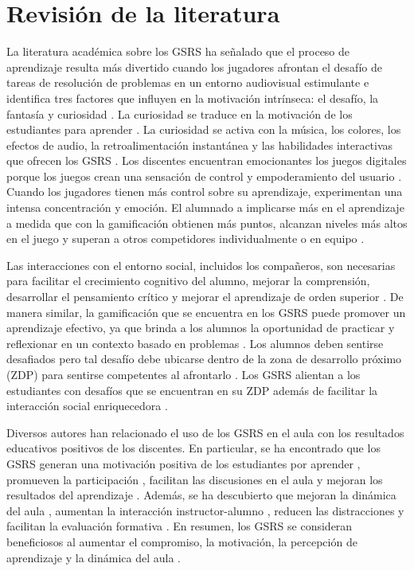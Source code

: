 \documentclass[spanish]{textolivre}
\begin{document}
\section{Revisión de la literatura}\label{sec-2}
La literatura académica sobre los GSRS ha señalado que el proceso de aprendizaje resulta más divertido cuando los jugadores afrontan el desafío de tareas de resolución de problemas en un entorno audiovisual estimulante e identifica tres factores que influyen en la motivación intrínseca: el desafío, la fantasía y curiosidad \cite{licorish2018, malone1981, wang2015}. La curiosidad se traduce en la motivación de los estudiantes para aprender \cite{ryan2000}. La curiosidad se activa con la música, los colores, los efectos de audio, la retroalimentación instantánea y las habilidades interactivas que ofrecen los GSRS \cite{malone1981}. Los discentes encuentran emocionantes los juegos digitales porque los juegos crean una sensación de control y empoderamiento del usuario \cite{malone1981}. Cuando los jugadores tienen más control sobre su aprendizaje, experimentan una intensa concentración y emoción. El alumnado a implicarse más en el aprendizaje a medida que con la gamificación obtienen más puntos, alcanzan niveles más altos en el juego y superan a otros competidores individualmente o en equipo \cite{dominguez2013, malone1987}.

Las interacciones con el entorno social, incluidos los compañeros, son necesarias para facilitar el crecimiento cognitivo del alumno, mejorar la comprensión, desarrollar el pensamiento crítico y mejorar el aprendizaje de orden superior \cite{pahamzah2020}. De manera similar, la gamificación que se encuentra en los GSRS puede promover un aprendizaje efectivo, ya que brinda a los alumnos la oportunidad de practicar y reflexionar en un contexto basado en problemas \cite{awwal2015}. Los alumnos deben sentirse desafiados pero tal desafío debe ubicarse dentro de la zona de desarrollo próximo (ZDP) para sentirse competentes al afrontarlo \cite{vygotskii1978}. Los GSRS alientan a los estudiantes con desafíos que se encuentran en su ZDP además de facilitar la interacción social enriquecedora \cite{chaiklin2003}.

Diversos autores han relacionado el uso de los GSRS en el aula con los resultados educativos positivos de los discentes. En particular, se ha encontrado que los GSRS generan una motivación positiva de los estudiantes por aprender \cite{iaremenko2017}, promueven la participación \cite{bottentuit2020, wang2015}, facilitan las discusiones en el aula \cite{mason2021} y mejoran los resultados del aprendizaje \cite{dakka2015}. Además, se ha descubierto que mejoran la dinámica del aula \cite{hung2017, yunus2021}, aumentan la interacción instructor-alumno \cite{mendez2013}, reducen las distracciones \cite{licorish2018} y facilitan la evaluación formativa \cite{balta2018, dewi2021}. En resumen, los GSRS se consideran beneficiosos al aumentar el compromiso, la motivación, la percepción de aprendizaje y la dinámica del aula \cite{fakhruddin2020}.
\end{document}
